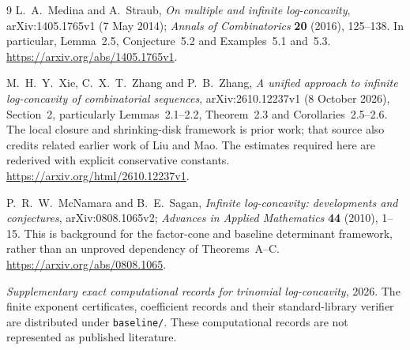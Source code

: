 \documentclass[11pt,a4paper]{article}
\begin{document}
\begin{thebibliography}{9}
 L.~A.~Medina and A.~Straub, \emph{On multiple and infinite log-concavity}, arXiv:1405.1765v1 (7 May 2014); \emph{Annals of Combinatorics} \textbf{20} (2016), 125--138. In particular, Lemma~2.5, Conjecture~5.2 and Examples~5.1 and~5.3. \url{https://arxiv.org/abs/1405.1765v1}.

 M.~H.~Y.~Xie, C.~X.~T.~Zhang and P.~B.~Zhang, \emph{A unified approach to infinite log-concavity of combinatorial sequences}, arXiv:2610.12237v1 (8 October 2026), Section~2, particularly Lemmas~2.1--2.2, Theorem~2.3 and Corollaries~2.5--2.6. The local closure and shrinking-disk framework is prior work; that source also credits related earlier work of Liu and Mao. The estimates required here are rederived with explicit conservative constants. \url{https://arxiv.org/html/2610.12237v1}.

 P.~R.~W.~McNamara and B.~E.~Sagan, \emph{Infinite log-concavity: developments and conjectures}, arXiv:0808.1065v2; \emph{Advances in Applied Mathematics} \textbf{44} (2010), 1--15. This is background for the factor-cone and baseline determinant framework, rather than an unproved dependency of Theorems~A--C. \url{https://arxiv.org/abs/0808.1065}.

 \emph{Supplementary exact computational records for trinomial log-concavity}, 2026. The finite exponent certificates, coefficient records and their standard-library verifier are distributed under \texttt{baseline/}. These computational records are not represented as published literature.
\end{thebibliography}
\end{document}
